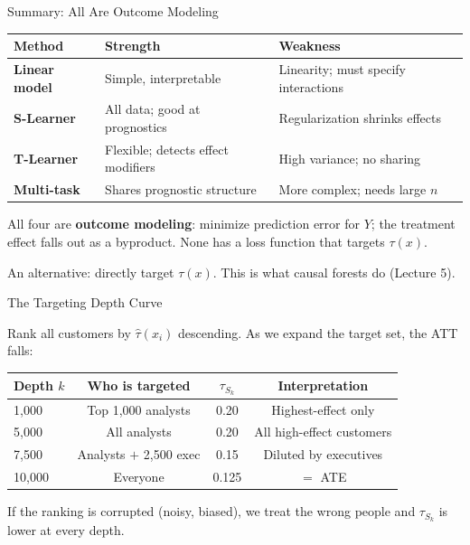 \documentclass[aspectratio=169, 11pt]{beamer}
\begin{document}
\begin{frame}{Summary: All Are Outcome Modeling}
 
\begin{center}
\begin{tabular}{p{2.5cm}p{4cm}p{4.5cm}}
\toprule
\textbf{Method} & \textbf{Strength} & \textbf{Weakness} \\
\midrule
\textbf{Linear model} & Simple, interpretable & Linearity; must specify interactions \\[0.6em]
\textbf{S-Learner} & All data; good at prognostics & Regularization shrinks effects \\[0.6em]
\textbf{T-Learner} & Flexible; detects effect modifiers & High variance; no sharing \\[0.6em]
\textbf{Multi-task} & Shares prognostic structure & More complex; needs large $n$ \\
\bottomrule
\end{tabular}
\end{center}
 
All four are \textbf{outcome modeling}: minimize prediction error for $Y$; the treatment effect falls out as a byproduct. None has a loss function that targets $\tau(x)$.  
 
\bigskip
 
An alternative: directly target $\tau(x)$. This is what causal forests do (Lecture 5).
\end{frame}


\begin{frame}{The Targeting Depth Curve}
 
Rank all customers by $\hat{\tau}(x_i)$ descending. As we expand the target set, the ATT falls:
 
\bigskip
 
\begin{center}
\begin{tabular}{lccc}
\toprule
\textbf{Depth} $k$ & \textbf{Who is targeted} & $\tau_{S_k}$ & \textbf{Interpretation} \\
\midrule
1,000 & Top 1,000 analysts & 0.20 & Highest-effect only \\
5,000 & All analysts & 0.20 & All high-effect customers \\
7,500 & Analysts $+$ 2,500 exec & 0.15 & Diluted by executives \\
10,000 & Everyone & 0.125 & $=$ ATE \\
\bottomrule
\end{tabular}
\end{center}
 
\bigskip
 
If the ranking is corrupted (noisy, biased), we treat the wrong people and $\tau_{S_k}$ is lower at every depth.
\end{frame}
 
\end{document}

